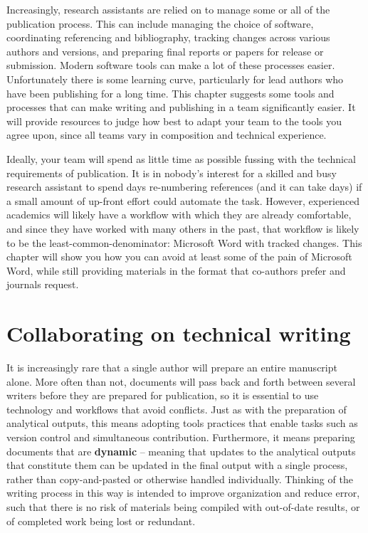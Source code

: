 
\begin{fullwidth}
Increasingly, research assistants are relied on to manage some or all
of the publication process. This can include
managing the choice of software,
coordinating referencing and bibliography,
tracking changes across various authors and versions,
and preparing final reports or papers for release or submission.
Modern software tools can make a lot of these processes easier.
Unfortunately there is some learning curve,
particularly for lead authors who have been publishing for a long time.
This chapter suggests some tools and processes
that can make writing and publishing in a team significantly easier.
It will provide resources
to judge how best to adapt your team to the tools you agree upon,
since all teams vary in composition and technical experience.

Ideally, your team will spend as little time as possible
fussing with the technical requirements of publication.
It is in nobody's interest for a skilled and busy research assistant
to spend days re-numbering references (and it can take days)
if a small amount of up-front effort could automate the task.
However, experienced academics will likely have a workflow
with which they are already comfortable,
and since they have worked with many others in the past,
that workflow is likely to be the least-common-denominator:
Microsoft Word with tracked changes.
This chapter will show you how you can avoid at least some
of the pain of Microsoft Word,
while still providing materials in the format
that co-authors prefer and journals request.
\end{fullwidth}


\section{Collaborating on technical writing}

It is increasingly rare that a single author will prepare an entire manuscript alone.
More often than not, documents will pass back and forth between several writers
before they are prepared for publication,
so it is essential to use technology and workflows that avoid conflicts.
Just as with the preparation of analytical outputs,
this means adopting tools practices that enable tasks
such as version control and simultaneous contribution.
Furthermore, it means preparing documents that are \textbf{dynamic} --
meaning that updates to the analytical outputs that constitute them
can be updated in the final output with a single process,
rather than copy-and-pasted or otherwise handled individually.
Thinking of the writing process in this way
is intended to improve organization and reduce error,
such that there is no risk of materials being compiled
with out-of-date results, or of completed work being lost or redundant.


